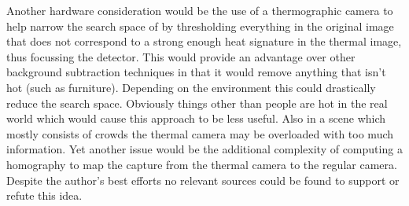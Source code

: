 \documentclass[conference]{IEEEtran}
\begin{document}
Another hardware consideration would be the use of a thermographic camera to help narrow the search space of by thresholding everything in the original image that does not correspond to a strong enough heat signature in the thermal image, thus focussing the detector. This would provide an advantage over other background subtraction techniques in that it would remove anything that isn't hot (such as furniture). Depending on the environment this could drastically reduce the search space. Obviously things other than people are hot in the real world which would cause this approach to be less useful. Also in a scene which mostly consists of crowds the thermal camera may be overloaded with too much information. Yet another issue would be the additional complexity of computing a homography to map the capture from the thermal camera to the regular camera. Despite the author's best efforts no relevant sources could be found to support or refute this idea.


%
%



%
%
\end{document}
